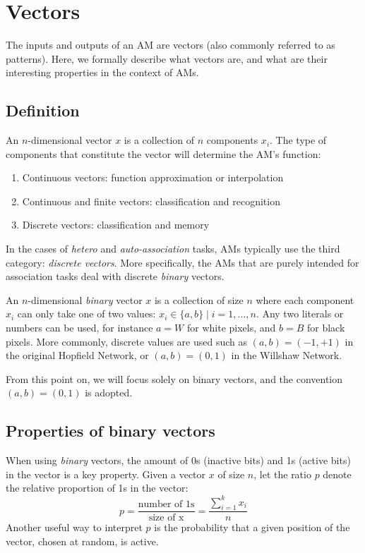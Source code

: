 \documentclass{article}
\begin{document}
\section{Vectors}
\label{sec:inputoutput}
The inputs and outputs of an AM are vectors (also commonly referred to as patterns). Here, we formally describe what vectors are, and what are their interesting properties in the context of AMs.
\subsection{Definition}
An $n$-dimensional vector $x$ is a collection of  $n$ components $x_i$. The type of components that constitute the vector will determine the AM's function:
\begin{enumerate}
    \item Continuous vectors: function approximation or interpolation
    \item Continuous and finite vectors: classification and recognition
    \item Discrete vectors: classification and memory
\end{enumerate}
In the cases of \textit{hetero} and \textit{auto-association} tasks, AMs typically use the third category:\textit{ discrete vectors}. More specifically, the AMs that are purely intended for association tasks deal with discrete \textit{binary} vectors.

An $n$-dimensional \textit{binary} vector $x$ is a collection of size $n$ where each component $x_i$ can only take one of two values: $x_i \in \{ a,b \} \mid i=1, \dots,n$.
Any two literals or numbers can be used, for instance $a=W$ for white pixels, and $b=B$ for black pixels. More commonly, discrete values are used such as $(a,b)=(-1,+1)$ in the original Hopfield Network, or $(a,b)=(0,1 )$ in the Willshaw Network.
\newline

From this point on, we will focus solely on binary vectors, and the convention $(a,b)=(0,1)$ is adopted.

\subsection{Properties of binary vectors}
When using \textit{binary} vectors, the amount of 0s (inactive bits) and 1s (active bits) in the vector is a key property.
Given a vector $x$ of size $n$, let the ratio $p$ denote the relative proportion of 1s in the vector:
\begin{equation}
    p = \frac{\text{number of 1s}}{\text{size of x}} =  \frac{\sum\limits_{i=1}^k{x_i}}{n}
\end{equation}
Another useful way to interpret $p$ is the probability that a given position of the vector, chosen at random, is active.
\end{document}
